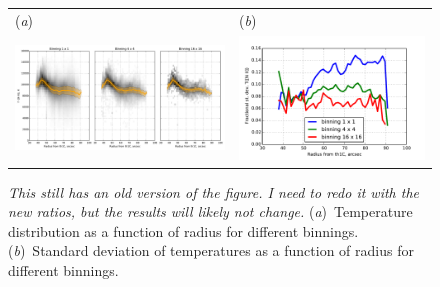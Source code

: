 \documentclass[preprint]{aastex}
\begin{document}
\begin{figure}
  \centering
  \begin{tabular}{ll}
    (\textit{a}) & (\textit{b}) \\
    \includegraphics[height=0.35\textheight]{Tnii-vs-radius-binning} &
    \includegraphics[height=0.25\textheight]{sigma-Tnii-vs-radius-binning}
  \end{tabular}
  \caption{\textit{This still has an old version of the figure.  I
      need to redo it with the new ratios, but the results will likely
      not change.}  (\textit{a})~Temperature distribution as a function of
    radius for different binnings.  (\textit{b})~Standard deviation of
    temperatures as a function of radius for different binnings. 
  }
  \label{fig:tnii-vs-rad}
\end{figure}
\end{document}
